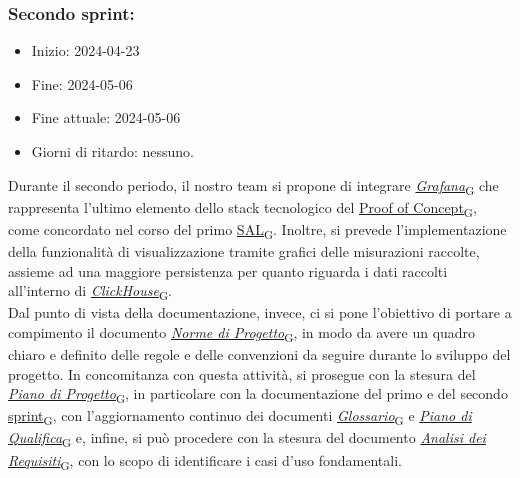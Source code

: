 \newpage
\subsubsection{Secondo sprint:}
\begin{itemize}
	\item Inizio: 2024-04-23
	\item Fine: 2024-05-06
	\item Fine attuale: 2024-05-06
	\item Giorni di ritardo: nessuno.
\end{itemize}

Durante il secondo periodo, il nostro team si propone di integrare \href{https://7last.github.io/docs/rtb/documentazione-interna/glossario\#grafana}{\textit{Grafana}\textsubscript{G}} che rappresenta l'ultimo elemento dello stack tecnologico del \href{https://7last.github.io/docs/rtb/documentazione-interna/glossario\#proof-of-concept}{Proof of Concept\textsubscript{G}}, come concordato nel corso del primo \href{https://7last.github.io/docs/rtb/documentazione-interna/glossario\#stato-avanzamento-lavori}{SAL\textsubscript{G}}. Inoltre, si prevede l'implementazione della funzionalità di visualizzazione tramite grafici delle misurazioni raccolte,
assieme ad una maggiore persistenza per quanto riguarda i dati raccolti all'interno di \href{https://7last.github.io/docs/rtb/documentazione-interna/glossario\#clickhouse}{\textit{ClickHouse}\textsubscript{G}}. \\
Dal punto di vista della documentazione, invece, ci si pone l'obiettivo di portare a compimento il documento \href{https://7last.github.io/docs/rtb/documentazione-interna/glossario\#norme-di-progetto}{\textit{Norme di Progetto}\textsubscript{G}}, in modo da avere un quadro chiaro e definito delle regole e delle convenzioni da seguire durante lo sviluppo del progetto. In concomitanza con questa attività, si prosegue con la stesura del \href{https://7last.github.io/docs/rtb/documentazione-interna/glossario\#piano-di-progetto}{\textit{Piano di Progetto}\textsubscript{G}}, in particolare con la documentazione del primo e del secondo \href{https://7last.github.io/docs/rtb/documentazione-interna/glossario\#sprint}{sprint\textsubscript{G}}, con l'aggiornamento continuo dei documenti \href{https://7last.github.io/docs/rtb/documentazione-interna/glossario\#glossario}{\textit{Glossario}\textsubscript{G}} e \href{https://7last.github.io/docs/rtb/documentazione-interna/glossario\#piano-di-qualifica}{\textit{Piano di Qualifica}\textsubscript{G}} e, infine, si può procedere con la stesura del documento \href{https://7last.github.io/docs/rtb/documentazione-interna/glossario\#analisi-dei-requisiti}{\textit{Analisi dei Requisiti}\textsubscript{G}}, con lo scopo di identificare i casi d'uso fondamentali. \\
